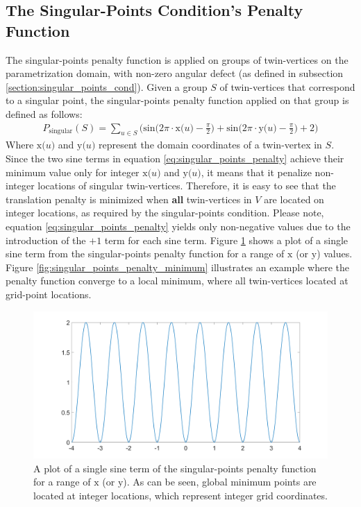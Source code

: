 \subsection{The Singular-Points Condition's Penalty Function}
\label{section:singular_points_penlaty_function_method}
The singular-points penalty function is applied on groups of twin-vertices on the parametrization domain, with non-zero angular defect (as defined in subsection \ref{section:singular_points_cond}). Given a group $S$ of twin-vertices that correspond to a singular point, the singular-points penalty function applied on that group is defined as follows:
\begin{equation}\label{eq:singular_points_penalty}
\begin{split}
P_{\mathrm{singular}}\left(S\right) = \sum_{u \in S} \bigg( \mathrm{sin} \Big( 2\pi\cdot\mathrm{x}\big(u\big) - \frac{\pi}{2}\Big) + \mathrm{sin} \Big( 2\pi\cdot\mathrm{y}\big(u\big) - \frac{\pi}{2}\Big) + 2 \bigg)
\end{split}
\end{equation}
Where $\mathrm{x}\big(u\big)$ and $\mathrm{y}\big(u\big)$ represent the domain coordinates of a twin-vertex in $S$. Since the two sine terms in equation \ref{eq:singular_points_penalty} achieve their minimum value only for integer $\mathrm{x}\big(u\big)$ and $\mathrm{y}\big(u\big)$, it means that it penalize non-integer locations of singular twin-vertices. Therefore, it is easy to see that the translation penalty is minimized when \textbf{all} twin-vertices in $V$ are located on integer locations, as required by the singular-points condition. Please note, equation \ref{eq:singular_points_penalty} yields only non-negative values due to the introduction of the $+1$ term for each sine term. Figure \ref{fig:singular_points_penalty_sine_term} shows a plot of a single sine term from the singular-points penalty function for a range of $\mathrm{x}$ (or $\mathrm{y}$) values. Figure \ref{fig:singular_points_penalty_minimum} illustrates an example where the penalty function converge to a local minimum, where all twin-vertices located at grid-point locations.
\begin{figure}[ht]
\centering
\includegraphics[width=13cm]{figures/singular_points/singular_points_penalty_function_sine_term.png}
\caption[The Singular-Points Penalty Function (Single Sine Term)]{A plot of a single sine term of the singular-points penalty function for a range of $\mathrm{x}$ (or $\mathrm{y}$). As can be seen, global minimum points are located at integer locations, which represent integer grid coordinates.}
\label{fig:singular_points_penalty_sine_term}
\end{figure}
